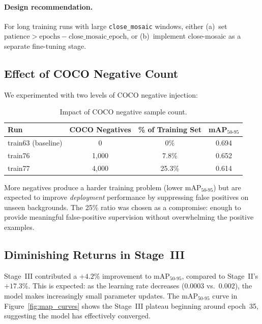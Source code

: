 \documentclass[12pt, titlepage]{article}
\begin{document}
\paragraph{Design recommendation.}  For long training runs with large \texttt{close\_mosaic} windows, either
(a)~set $\text{patience} > \text{epochs} - \text{close\_mosaic\_epoch}$, or
(b)~implement close-mosaic as a separate fine-tuning stage.

\subsection{Effect of COCO Negative Count}

We experimented with two levels of COCO negative injection:

\begin{table}[h]
  \centering
  \caption{Impact of COCO negative sample count.}
  \label{tab:coco_count}
  \begin{tabular}{@{}lccc@{}}
    \toprule
    \textbf{Run}       & \textbf{COCO Negatives} & \textbf{\% of Training Set} & \textbf{mAP$_{50\text{-}95}$} \\
    \midrule
    train63 (baseline) & 0                       & 0\%                         & 0.694                         \\
    train76            & 1{,}000                 & 7.8\%                       & 0.652                         \\
    train77            & 4{,}000                 & 25.3\%                      & 0.614                         \\
    \bottomrule
  \end{tabular}
\end{table}

More negatives produce a harder training problem (lower mAP$_{50\text{-}95}$)
but are expected to improve \emph{deployment} performance by suppressing false
positives on unseen backgrounds. The 25\% ratio was chosen as a compromise:
enough to provide meaningful false-positive supervision without overwhelming
the positive examples.

\subsection{Diminishing Returns in Stage~III}

Stage~III contributed a $+4.2\%$ improvement to mAP$_{50\text{-}95}$, compared
to Stage~II's $+17.3\%$. This is expected: as the learning rate decreases
($0.0003$ vs.\ $0.002$), the model makes increasingly small parameter updates.
The mAP$_{50\text{-}95}$ curve in Figure~\ref{fig:map_curves} shows the
Stage~III plateau beginning around epoch~35, suggesting the model has
effectively converged.
\end{document}
